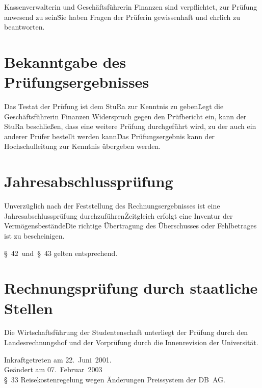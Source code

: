 \Abs \Satz Kassenverwalterin und Geschäftsführerin Finanzen sind verpflichtet, zur Prüfung anwesend zu sein\. Sie haben Fragen der Prüferin gewissenhaft und ehrlich zu beantworten.



\section{Bekanntgabe des Prüfungsergebnisses}

\Abs \Satz Das Testat der Prüfung ist dem StuRa zur Kenntnis zu geben\. Legt die Geschäftsführerin Finanzen Widerspruch gegen den Prüfbericht ein, kann der StuRa beschließen, dass eine weitere Prüfung durchgeführt wird, zu der auch ein anderer Prüfer bestellt werden kann\. Das Prüfungsergebnis kann der Hochschulleitung zur Kenntnis übergeben werden.



\section{Jahresabschlussprüfung}

\Abs \Satz Unverzüglich nach der Feststellung des Rechnungsergebnisses ist eine Jahresabschlussprüfung durchzuführen\. Zeitgleich erfolgt eine Inventur der Vermögensbestände\. Die richtige Übertragung des Überschusses oder Fehlbetrages ist zu bescheinigen.

\Abs \Satz §~42~und~§~43 gelten entsprechend.

\section{Rechnungsprüfung durch staatliche Stellen}

\Abs \Satz Die Wirtschaftsführung der Studentenschaft unterliegt der Prüfung durch den Landesrechnungshof und der Vorprüfung durch die Innenrevision der Universität.


\nopagebreak
\vspace{1cm}
Inkraftgetreten am 22.~Juni~2001.
\\


\footnotesize
Geändert am 07.~Februar~2003\\
§~33 Reisekostenregelung wegen Änderungen Preissystem der DB~AG.

